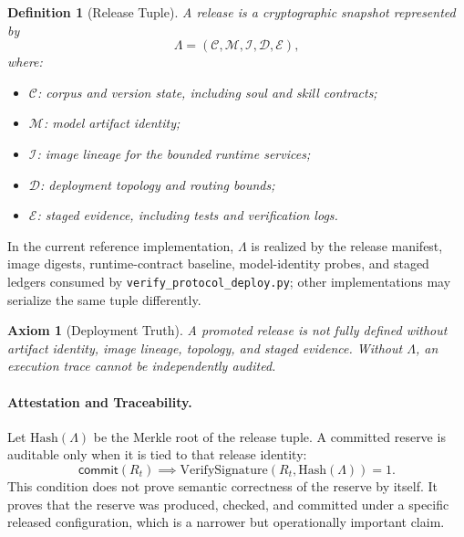 \documentclass[11pt]{article}
\newtheorem{definition}{Definition}[section]
\newtheorem{axiom}{Axiom}[section]
\theoremstyle{remark}
\newcommand{\Commit}{\mathsf{commit}}
\begin{document}
\begin{definition}[Release Tuple]
A release is a cryptographic snapshot represented by
\[
\Lambda=(\mathcal{C},\mathcal{M},\mathcal{I},\mathcal{D},\mathcal{E}),
\]
where:
\begin{itemize}
    \item \(\mathcal{C}\): corpus and version state, including soul and skill contracts;
    \item \(\mathcal{M}\): model artifact identity;
    \item \(\mathcal{I}\): image lineage for the bounded runtime services;
    \item \(\mathcal{D}\): deployment topology and routing bounds;
    \item \(\mathcal{E}\): staged evidence, including tests and verification logs.
\end{itemize}
\end{definition}
In the current reference implementation, \(\Lambda\) is realized by the release manifest, image digests, runtime-contract baseline, model-identity probes, and staged ledgers consumed by \texttt{verify\_protocol\_deploy.py}; other implementations may serialize the same tuple differently.

\begin{axiom}[Deployment Truth]\label{ax:deployment-truth}
A promoted release is not fully defined without artifact identity, image lineage, topology, and staged evidence. Without \(\Lambda\), an execution trace cannot be independently audited.
\end{axiom}

\paragraph{Attestation and Traceability.}
Let \(\mathrm{Hash}(\Lambda)\) be the Merkle root of the release tuple. A committed reserve is auditable only when it is tied to that release identity:
\[
\Commit(R_t) \implies \mathrm{VerifySignature}(R_t,\mathrm{Hash}(\Lambda)) = 1.
\]
This condition does not prove semantic correctness of the reserve by itself. It proves that the reserve was produced, checked, and committed under a specific released configuration, which is a narrower but operationally important claim.
\end{document}
